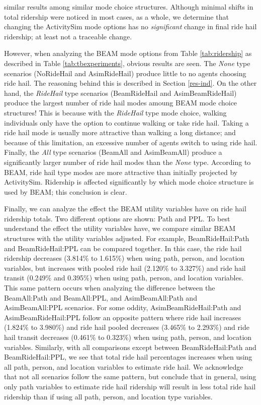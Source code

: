 \documentclass[fancy, masters]{byuthesis}
\begin{document}
similar results among similar mode choice structures. Although minimal shifts in total ridership were noticed in most cases, as a whole, we determine that changing the ActivitySim mode options has no \emph{significant} change in final ride hail ridership; at least not a traceable change.

However, when analyzing the BEAM mode options from Table \ref{tab:ridership} as described in Table \ref{tab:tbexperiments}, obvious results are seen. The \emph{None} type scenarios (NoRideHail and AsimRideHail) produce little to no agents choosing ride hail. The reasoning behind this is described in Section \ref{res-ind}. On the other hand, the \emph{RideHail} type scenarios (BeamRideHail and AsimBeamRideHail) produce the largest number of ride hail modes amoung BEAM mode choice structures! This is because with the \emph{RideHail} type mode choice, walking individuals only have the option to continue walking or take ride hail. Taking a ride hail mode is usually more attractive than walking a long distance; and because of this limitation, an excessive number of agents switch to using ride hail. Finally, the \emph{All} type scenarios (BeamAll and AsimBeamAll) produce a significantly larger number of ride hail modes than the \emph{None} type. According to BEAM, ride hail type modes are more attractive than initially projected by ActivitySim. Ridership is affected significantly by which mode choice structure is used by BEAM; this conclusion is clear.

Finally, we can analyze the effect the BEAM utility variables have on ride hail ridership totals. Two different options are shown: Path and PPL. To best understand the effect the utility variables have, we compare similar BEAM structures with the utility variables adjusted. For example, BeamRideHail:Path and BeamRideHail:PPL can be compared together. In this case, the ride hail ridership decreases (3.814\% to 1.615\%) when using path, person, and location variables, but increases with pooled ride hail (2.120\% to 3.327\%) and ride hail transit (0.249\% and 0.395\%) when using path, person, and location variables. This same pattern occurs when analyzing the difference between the BeamAll:Path and BeamAll:PPL, and AsimBeamAll:Path and AsimBeamAll:PPL scenarios. For some oddity, AsimBeamRideHail:Path and AsimBeamRideHail:PPL follow an opposite pattern where ride hail increases (1.824\% to 3.980\%) and ride hail pooled decreases (3.465\% to 2.293\%) and ride hail transit decreases (0.461\% to 0.323\%) when using path, person, and location variables. Similarly, with all comparisons except between BeamRideHail:Path and BeamRideHail:PPL, we see that total ride hail percentages increases when using all path, person, and location variables to estimate ride hail. We acknowledge that not all scenarios follow the same pattern, but conclude that in general, using only path variables to estimate ride hail ridership will result in less total ride hail ridership than if using all path, person, and location type variables.
\end{document}

